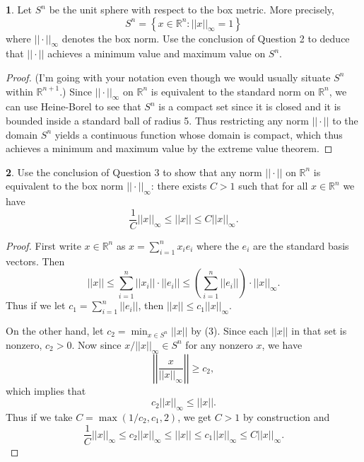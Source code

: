 \documentclass[12pt]{article}
\theoremstyle{definition}
\newtheorem{ex}{}
\begin{document}
\begin{ex}
	Let $S^n$ be the unit sphere with respect to the box metric.
	More precisely, \begin{equation*}
		S^n = \left\lbrace x \in \mathbb{R}^n : ||x||_\infty = 1 \right\rbrace
	\end{equation*}
	where $|| \cdot ||_\infty$ denotes the box norm.
	Use the conclusion of Question 2 to deduce that $|| \cdot ||$ achieves a minimum value and maximum value on $S^n$.
\end{ex}
\begin{proof}
	(I'm going with your notation even though we would usually situate $S^n$ within $\mathbb{R}^{n+1}$.)
	Since $||\cdot||_\infty$ on $\mathbb{R}^n$ is equivalent to the standard norm on $\mathbb{R}^n$, we can use Heine-Borel to see that $S^n$ is a compact set since it is closed and it is bounded inside a standard ball of radius 5.
	Thus restricting any norm $||\cdot||$ to the domain $S^n$ yields a continuous function whose domain is compact, which thus achieves a minimum and maximum value by the extreme value theorem.
\end{proof}

\begin{ex}
	Use the conclusion of Question 3 to show that any norm $|| \cdot ||$ on $\mathbb{R}^n$ is equivalent to the box norm $||\cdot||_\infty$: there exists $C > 1$ such that for all $x \in \mathbb{R}^n$ we have \begin{equation*}
		\frac{1}{C}||x||_\infty \leq ||x|| \leq C||x||_\infty.
	\end{equation*}
\end{ex}
\begin{proof}
	First write $x \in \mathbb{R}^n$ as $x = \sum_{i=1}^n x_ie_i$ where the $e_i$ are the standard basis vectors.
	Then \begin{equation*}
		||x|| \leq \sum_{i=1}^n ||x_i|| \cdot ||e_i|| \leq \left(\sum_{i=1}^n ||e_i||\right) \cdot ||x||_\infty.
	\end{equation*}
	Thus if we let $c_1 = \sum_{i=1}^n||e_i||$, then $||x|| \leq c_1||x||_\infty$.

	On the other hand, let $c_2 = \min_{x \in S^n}||x||$ by (3).
	Since each $||x||$ in that set is nonzero, $c_2 > 0$.
	Now since $x/||x||_\infty \in S^n$ for any nonzero $x$, we have \begin{equation*}
		\left| \left| \frac{x}{||x||_\infty} \right| \right| \geq c_2,
	\end{equation*}
	which implies that \begin{equation*}
		c_2||x||_\infty \leq ||x||.
	\end{equation*}
	Thus if we take $C = \max ( 1/c_2, c_1 , 2)$, we get $C > 1$ by construction and \begin{equation*}
    \frac{1}{C} ||x||_\infty \leq c_2||x||_\infty \leq ||x|| \leq c_1||x||_\infty \leq C||x||_\infty.
	\end{equation*}
\end{proof}
\end{document}
